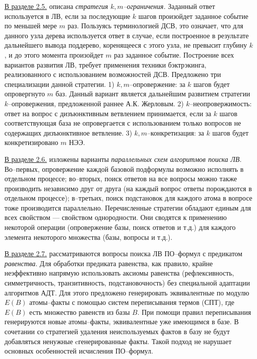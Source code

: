 \documentclass[a4paper]{report}
\begin{document}
\underline{В разделе 2.5.} описана \emph{стратегия $k,m$--ограничения.} Заданный ответ используется в ЛВ, если за последующие $k$ шагов произойдет заданное событие по меньшей мере $m$ раз. Пользуясь терминологией ДСВ, это означает, что для данного узла дерева используется ответ в случае, если построенное в результате дальнейшего вывода поддерево, коренящееся с этого узла, не превысит глубину $k$, и до этого момента произойдет $m$ раз заданное событие. Построение всех вариантов развития ЛВ, требует применения техники бэктрэкинга, реализованного с использованием возможностей ДСВ. Предложено три специализации данной стратегии. 1)  $k,m$--опровержение: за $k$ шагов будет опровергнуто $m$ баз. Данный вариант является дальнейшим развитием стратегии $k$--опровержения, предложенной раннее А.К. Жерловым. 2) $k$--неопровержимость: ответ на вопрос с дизъюнктивным ветвлением принимается, если за $k$ шагов соответствующая база не опровергается с использованием только вопросов не содержащих дизъюнктивное ветвление.  3) $k,m$--конкретизация: за $k$ шагов будет конкретизировано $m$ НЭЭ.

\underline{В разделе 2.6.} изложены варианты \emph{параллельных схем алгоритмов поиска ЛВ}. Во--первых, опровержение каждой базовой подформулы возможно исполнять в отдельном процессе; во--вторых, поиск ответов на все вопросы можно также производить независимо друг от друга (на каждый вопрос ответы порождаются в отдельном процессе); в--третьих, поиск подстановок для каждого атома в вопросе тоже производится параллельно. Перечисленные стратегии обладают единым для всех свойством --- свойством однородности. Они сводятся к применению некоторой операции (опровержение базы, поиск ответов и т.д.) для каждого элемента некоторого множества (базы, вопросы и т.д.).

\underline{В разделе 2.7.} рассматриваются вопросы поиска ЛВ ПО--формул с предикатом \emph{равенства}. Для обработки предиката равенства, как правило, крайне неэффективно напрямую использовать аксиомы равенства (рефлексивность, симметричность, транзитивность, подстановочность) без специальной адаптации алгоритмов АДТ. Для этого предложено генерировать эквивалентные по модулю $E(B)$ атомы--факты с помощью систем переписывания термов (СПТ), где $E(B)$ есть множество равенств из базы $B$. При помощи правил переписывания генерируются новые атомы--факты, эквивалентные уже имеющимся в базе. В сочетании со стратегией удаления неиспользуемых фактов в базу не будут добавляться ненужные cгенерированные факты. Такой подход не нарушает основных особенностей исчисления ПО--формул.
\end{document}
